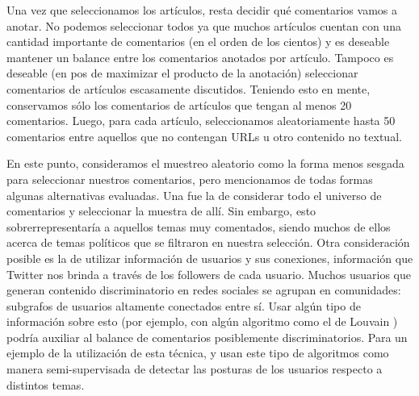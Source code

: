 Una vez que seleccionamos los artículos, resta decidir qué comentarios vamos a anotar. No podemos seleccionar todos ya que muchos artículos cuentan con una cantidad importante de comentarios (en el orden de los cientos) y es deseable mantener un balance entre los comentarios anotados por artículo. Tampoco es deseable (en pos de maximizar el producto de la anotación) seleccionar comentarios de artículos escasamente discutidos. Teniendo esto en mente, conservamos sólo los comentarios de artículos que tengan al menos 20 comentarios. Luego, para cada artículo, seleccionamos aleatoriamente hasta 50 comentarios entre aquellos que no contengan URLs u otro contenido no textual.

En este punto, consideramos el muestreo aleatorio como la forma menos sesgada para seleccionar nuestros comentarios, pero mencionamos de todas formas algunas alternativas evaluadas. Una fue la de considerar todo el universo de comentarios y seleccionar la muestra de allí. Sin embargo, esto sobrerrepresentaría a aquellos temas muy comentados, siendo muchos de ellos acerca de temas políticos que se filtraron en nuestra selección. Otra consideración posible es la de utilizar información de usuarios y sus conexiones, información que Twitter nos brinda a través de los followers de cada usuario. Muchos usuarios que generan contenido discriminatorio en redes sociales se agrupan en comunidades: subgrafos de usuarios altamente conectados entre sí. Usar algún tipo de información sobre esto (por ejemplo, con algún algoritmo como el de Louvain \cite{blondel2008fast}) podría auxiliar al balance de comentarios posiblemente discriminatorios. Para un ejemplo de la utilización de esta técnica, \citet{lai2018stance} y \citet{furman2021you} usan este tipo de algoritmos como manera semi-supervisada de detectar las posturas de los usuarios respecto a distintos temas.

